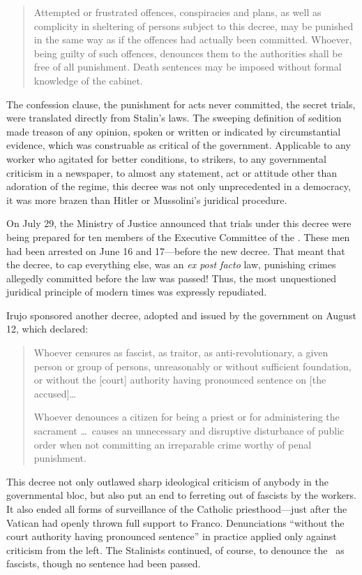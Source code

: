 \begin{quotation}
  Attempted or frustrated offences, conspiracies and plans, as well as complicity in sheltering of persons subject to this decree, may be punished in the same way as if the offences had actually been committed. Whoever, being guilty of such offences, denounces them to the authorities shall be free of all punishment. Death sentences may be imposed without formal knowledge of the cabinet.
\end{quotation}

The confession clause, the punishment for acts never committed, the secret trials, were translated directly from Stalin’s laws. The sweeping definition of sedition made treason of any opinion, spoken or written or indicated by circumstantial evidence, which was construable as critical of the government. Applicable to any worker who agitated for better conditions, to strikers, to any governmental criticism in a newspaper, to almost any statement, act or attitude other than adoration of the regime, this decree was not only unprecedented in a democracy, it was more brazen than Hitler or Mussolini’s juridical procedure.
\noclub

On July 29, the Ministry of Justice announced that trials under this decree were being prepared for ten members of the Executive Committee of the \POUM. These men had been arrested on June 16 and 17---before the new decree. That meant that the decree, to cap everything else, was an \emph{ex post facto} law, punishing crimes allegedly committed before the law was passed! Thus, the most unquestioned juridical principle of modern times was expressly repudiated.

Irujo sponsored another decree, adopted and issued by the government on August 12, which declared:

\begin{quotation}
  Whoever censures as fascist, as traitor, as anti-rev\-o\-lu\-tion\-ary, a given person or group of persons, unreasonably or without sufficient foundation, or without the [court] authority having pronounced sentence on [the accused]\dots
  
  Whoever denounces a citizen for being a priest or for administering the sacrament \dots\ causes an unnecessary and disruptive disturbance of public order when not committing an irreparable crime worthy of penal punishment.
\end{quotation}

This decree not only outlawed sharp ideological criticism of anybody in the governmental bloc, but also put an end to ferreting out of fascists by the workers. It also ended all forms of surveillance of the Catholic priesthood---just after the Vatican had openly thrown full support to Franco. Denunciations ``without the court authority having pronounced sentence'' in practice applied only against criticism from the left. The Stalinists continued, of course, to denounce the \POUM\ as fascists, though no sentence had been passed.

